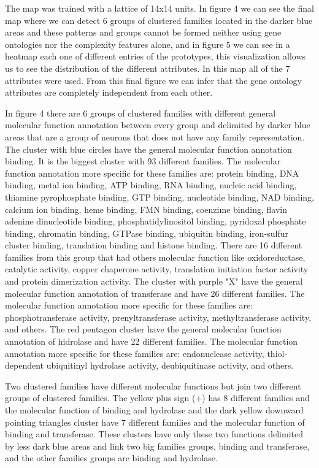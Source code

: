 \documentclass[preprint,12pt]{elsarticle}
\begin{document}
The map was trained with a lattice of 14x14 units. In figure 4 we 
can see the final map where we can detect 6 groups of clustered families 
located in the darker blue areas and these patterns and groups cannot 
be formed neither using gene ontologies  nor the complexity features 
alone, and in figure 5 we can see in a heatmap each one of different 
entries of the prototypes, this visualization allows us to see the 
distribution of the different attributes. In this map all of the 7 
attributes were used. From this final figure we can infer that the 
gene ontology attributes are completely independent from each other. 
\par 

In figure 4 there are 6 groups of clustered families with different 
general molecular function annotation between every group and 
delimited by darker blue areas that are a group of neurons that 
does not have any family representation. 
The cluster with blue circles have the general molecular function 
annotation binding. It is the biggest cluster with 93 different 
families. The molecular function annotation more specific for 
these families are: protein binding, DNA binding, metal ion binding, 
ATP binding, RNA binding, nucleic acid binding, thiamine pyrophosphate 
binding, GTP binding, nucleotide binding, NAD binding, calcium ion 
binding, heme binding, FMN binding, coenzime binding, flavin adenine 
dinucleotide binding, phosphatidylinositol binding, pyridoxal phosphate 
binding, chromatin binding, GTPase binding, ubiquitin binding, iron-sulfur 
cluster binding, translation binding and histone binding. There are 16 
different families from this group that had others molecular function like 
oxidoreductase, catalytic activity, copper chaperone activity, translation 
initiation factor activity and protein dimerization activity. The cluster 
with purple "X" have the general molecular function annotation of 
transferase and have 26 different families. The molecular function 
annotation more specific for these families are: phosphotransferase 
activity, prenyltransferase activity, methyltransferase activity, and 
others. The red pentagon cluster have the general molecular function 
annotation of hidrolase and have 22 different families. The molecular 
function annotation more specific for these families are: endonuclease 
activity, thiol-dependent ubiquitinyl hydrolase activity, deubiquitinase 
activity, and others. \par 

Two clustered families have different molecular functions but join 
two different groups of clustered families. The yellow plus sign (+) 
has 8 different families and the molecular function of binding and 
hydrolase and the dark yellow downward pointing triangles cluster 
have 7 different families and the molecular function of binding and 
transferase. These clusters have only these two functions delimited 
by less dark blue areas and link two big families groups, binding 
and transferase, and the other families groups are binding and 
hydrolase. \par 
\end{document}
